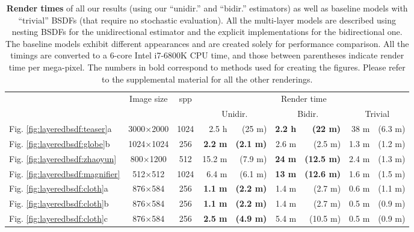 \begin{table}[h]
	\centering
	\caption[Render times of all our results]{\label{tab:layeredbsdf:performance}
		\textbf{Render times} of all our results (using our ``unidir.'' and ``bidir.'' estimators) as well as baseline models with ``trivial'' BSDFs (that require no stochastic evaluation).
		All the multi-layer models are described using nesting BSDFs for the unidirectional estimator and the explicit implementations for the bidirectional one.
		The baseline models exhibit different appearances and are created solely for performance comparison.
		All the timings are converted to a 6-core Intel i7-6800K CPU time, and those between parentheses indicate render time per mega-pixel.
		The numbers in bold correspond to methods used for creating the figures.
		Please refer to the supplemental material for all the other renderings.
	}
   	\addtolength{\tabcolsep}{0pt} 
   	\small
	\begin{tabular}{l|c|c|rr|rr|rr}
	& \multirow{2}{*}{Image size}  & \multirow{2}{*}{spp} & \multicolumn{6}{c}{Render time}\\
	& & & \multicolumn{2}{c}{Unidir.} & \multicolumn{2}{c}{Bidir.} & \multicolumn{2}{c}{Trivial}\\
	\hline
	Fig. \ref{fig:layeredbsdf:teaser}a 			& 3000$\times$2000 & 1024 & 2.5 h  		   	& (25 m) 			& \textbf{2.2 h}& \textbf{(22 m)}   & 38 m  & (6.3 m)\\
	Fig. \ref{fig:layeredbsdf:globe}b 			& 1024$\times$1024 & 256  & \textbf{2.2 m} 	& \textbf{(2.1 m)} 	& 2.6 m 		& (2.5 m)   		& 1.3 m & (1.2 m)\\
	Fig. \ref{fig:layeredbsdf:zhaoyun} 			& 800$\times$1200  & 512  & 15.2 m   	   	& (7.9 m)		 	& \textbf{24 m} & \textbf{(12.5 m)} & 2.4 m & (1.3 m)\\
	Fig. \ref{fig:layeredbsdf:magnifier} 		& 512$\times$512   & 1024 & 6.4 m 			& (6.1 m) 			& \textbf{13 m} & \textbf{(12.6 m)} & 1.6 m & (1.5 m)\\
	Fig. \ref{fig:layeredbsdf:cloth}a 			& 876$\times$584   & 256  & \textbf{1.1 m} 	& \textbf{(2.2 m)} 	& 1.4 m 		& (2.7 m)   		& 0.6 m & (1.1 m)\\
	Fig. \ref{fig:layeredbsdf:cloth}b 			& 876$\times$584   & 256  & \textbf{1.1 m} 	& \textbf{(2.2 m)} 	& 1.4 m 		& (2.7 m)		   	& 0.5 m & (0.9 m)\\
	Fig. \ref{fig:layeredbsdf:cloth}c 			& 876$\times$584   & 256  & \textbf{2.5 m} 	& \textbf{(4.9 m)}	& 5.4 m 		& (10.5 m)  		& 0.5 m & (0.9 m)\\

\end{tabular}
\end{table}
